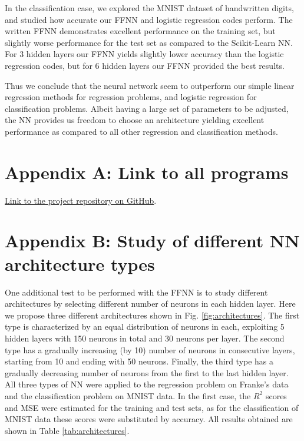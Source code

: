 \documentclass{emulateapj}
\begin{document}
In the classification case, we explored the MNIST dataset of handwritten digits, and studied how accurate our FFNN and logistic regression codes perform. The written FFNN demonstrates excellent performance on the training set, but slightly worse performance for the test set as compared to the Scikit-Learn NN. For 3 hidden layers our FFNN yields slightly lower accuracy than the logistic regression codes, but for 6 hidden layers our FFNN provided the best results. 


 Thus we conclude that the neural network seem to outperform our simple linear regression methods for regression problems, and logistic regression for classification problems. Albeit having a large set of parameters to be adjusted, the NN provides us freedom to choose an architecture yielding excellent performance as compared to all other regression and classification methods.


\section{Appendix A: Link to all programs}
\label{Appendix:A}
\href{https://github.com/tellefs/ML-projects/tree/master/project2}{Link to the project repository on GitHub}.

\section{Appendix B: Study of different NN architecture types}
\label{Appendix:B}

One additional test to be performed with the FFNN is to study different architectures by selecting different number of neurons in each hidden layer. Here we propose three different architectures shown in Fig. \ref{fig:architectures}. The first type is characterized by an equal distribution of neurons in each, exploiting 5 hidden layers with 150 neurons in total and 30 neurons per layer. The second type has a gradually increasing (by 10) number of neurons in consecutive layers, starting from 10 and ending with 50 neurons. Finally, the third type has a gradually decreasing number of neurons from the first to the last hidden layer. All three types of NN were applied to the regression problem on Franke's data and the classification problem on MNIST data. In the first case, the $R^2$ scores and MSE were estimated for the training and test sets, as for the classification of MNIST data these scores were substituted by accuracy. All results obtained are shown in Table \ref{tab:architectures}.
\end{document}
